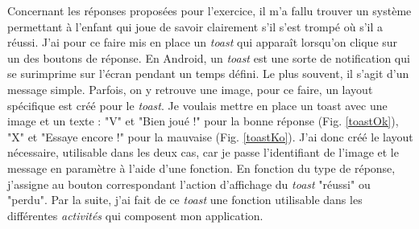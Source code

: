 
Concernant les réponses proposées pour l'exercice, il m'a fallu trouver un système permettant à l'enfant qui joue de savoir clairement s'il s'est trompé où s'il a réussi. J'ai pour ce faire mis en place un \textit{toast} qui apparaît lorsqu'on clique sur un des boutons de réponse. En Android, un \textit{toast} est une sorte de notification qui se surimprime sur l'écran pendant un temps défini. Le plus souvent, il s'agit d'un message simple. Parfois, on y retrouve une image, pour ce faire, un layout spécifique est créé pour le \textit{toast}. Je voulais mettre en place un toast avec une image et un texte : "V" et "Bien joué !" pour la bonne réponse (Fig. \ref{toastOk}), "X" et "Essaye encore !" pour la mauvaise (Fig. \ref{toastKo}). J'ai donc créé le layout nécessaire, utilisable dans les deux cas, car je passe l'identifiant de l'image et le message en paramètre à l'aide d'une fonction. En fonction du type de réponse, j'assigne au bouton correspondant l'action d'affichage du \textit{toast} "réussi" ou "perdu". Par la suite, j'ai fait de ce \textit{toast} une fonction utilisable dans les différentes \textit{activités} qui composent mon application.\\

